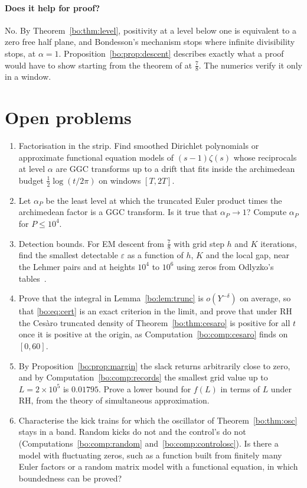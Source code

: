 \paragraph{Does it help for proof?} No. By Theorem~\ref{bo:thm:level}, positivity at a level below one is equivalent to a zero free half plane, and Bondesson's mechanism stops where infinite divisibility stops, at $\alpha=1$. Proposition~\ref{bo:prop:descent} describes exactly what a proof would have to show starting from the theorem of \cite{OAI26a} at $\frac78$. The numerics verify it only in a window.

\section{Open problems}

\begin{enumerate}
\item Factorisation in the strip. Find smoothed Dirichlet polynomials or approximate functional equation models of $(s-1)\zeta(s)$ whose reciprocals at level $\alpha$ are GGC transforms up to a drift that fits inside the archimedean budget $\frac12\log(t/2\pi)$ on windows $[T,2T]$.
\item Let $\alpha_P$ be the least level at which the truncated Euler product times the archimedean factor is a GGC transform. Is it true that $\alpha_P\to1$? Compute $\alpha_P$ for $P\le10^4$.
\item Detection bounds. For EM descent from $\frac78$ with grid step $h$ and $K$ iterations, find the smallest detectable $\varepsilon$ as a function of $h$, $K$ and the local gap, near the Lehmer pairs and at heights $10^4$ to $10^6$ using zeros from Odlyzko's tables~\cite{OdlyzkoTables}.
\item Prove that the integral in Lemma~\ref{bo:lem:trunc} is $o(Y^{-\delta})$ on average, so that \eqref{bo:eq:cert} is an exact criterion in the limit, and prove that under RH the Ces\`aro truncated density of Theorem~\ref{bo:thm:cesaro} is positive for all $t$ once it is positive at the origin, as Computation~\ref{bo:comp:cesaro} finds on $[0,60]$.
\item By Proposition~\ref{bo:prop:margin} the slack returns arbitrarily close to zero, and by Computation~\ref{bo:comp:records} the smallest grid value up to $L=2\times10^5$ is $0.01795$. Prove a lower bound for $f(L)$ in terms of $L$ under RH, from the theory of simultaneous approximation.
\item Characterise the kick trains for which the oscillator of Theorem~\ref{bo:thm:osc} stays in a band. Random kicks do not and the control's do not (Computations~\ref{bo:comp:random} and~\ref{bo:comp:controlosc}). Is there a model with fluctuating zeros, such as a function built from finitely many Euler factors or a random matrix model with a functional equation, in which boundedness can be proved?

\end{enumerate}
